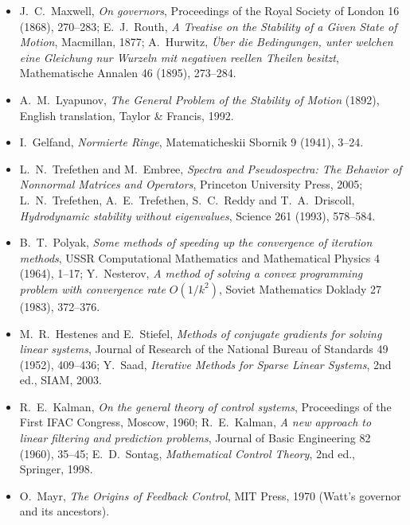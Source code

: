 \begin{itemize}
\item J.~C.~Maxwell, \emph{On governors}, Proceedings of the Royal Society of London 16 (1868), 270--283; E.~J.~Routh, \emph{A Treatise on
the Stability of a Given State of Motion}, Macmillan, 1877; A.~Hurwitz, \emph{\"Uber die Bedingungen, unter welchen eine Gleichung nur
Wurzeln mit negativen reellen Theilen besitzt}, Mathematische Annalen 46 (1895), 273--284.
\item A.~M.~Lyapunov, \emph{The General Problem of the Stability of Motion} (1892), English translation, Taylor \& Francis, 1992.
\item I.~Gelfand, \emph{Normierte Ringe}, Matematicheskii Sbornik 9 (1941), 3--24.
\item L.~N.~Trefethen and M.~Embree, \emph{Spectra and Pseudospectra: The Behavior of Nonnormal Matrices and Operators}, Princeton
University Press, 2005; L.~N.~Trefethen, A.~E.~Trefethen, S.~C.~Reddy and T.~A.~Driscoll, \emph{Hydrodynamic stability without
eigenvalues}, Science 261 (1993), 578--584.
\item B.~T.~Polyak, \emph{Some methods of speeding up the convergence of iteration methods}, USSR Computational Mathematics and
Mathematical Physics 4 (1964), 1--17; Y.~Nesterov, \emph{A method of solving a convex programming problem with convergence rate
$O(1/k^2)$}, Soviet Mathematics Doklady 27 (1983), 372--376.
\item M.~R.~Hestenes and E.~Stiefel, \emph{Methods of conjugate gradients for solving linear systems}, Journal of Research of the National
Bureau of Standards 49 (1952), 409--436; Y.~Saad, \emph{Iterative Methods for Sparse Linear Systems}, 2nd ed., SIAM, 2003.
\item R.~E.~Kalman, \emph{On the general theory of control systems}, Proceedings of the First IFAC Congress, Moscow, 1960; R.~E.~Kalman,
\emph{A new approach to linear filtering and prediction problems}, Journal of Basic Engineering 82 (1960), 35--45; E.~D.~Sontag,
\emph{Mathematical Control Theory}, 2nd ed., Springer, 1998.
\item O.~Mayr, \emph{The Origins of Feedback Control}, MIT Press, 1970 (Watt's governor and its ancestors).
\end{itemize}
